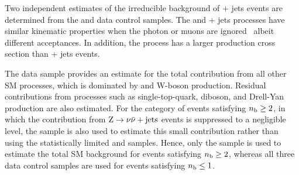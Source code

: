 Two independent estimates of the irreducible background of \znunu +
jets events are determined from the \gj and \mmj data control samples.
The \gj and \zmumu + jets processes have similar kinematic properties
when the photon or muons are ignored~\cite{Bern:2011pa} albeit
different acceptances. In addition, the \gj process has a larger
production cross section than \znunu + jets events.

The \mj data sample provides an estimate for the total
contribution from all other SM processes, which is dominated by \ttbar
and W-boson production. Residual contributions from processes such as
single-top-quark, diboson, and Drell-Yan production are also
estimated. For the category of events satisfying $\nb \geq 2$, in
which the contribution from $\znunu + \text{jets}$ events is
suppressed to a negligible level, the \mj sample is also used to
estimate this small contribution rather than using the statistically
limited \mmj and \gj samples. Hence, only the \mj sample is used to
estimate the total SM background for events satisfying $\nb \geq 2$,
whereas all three data control samples are used for events satisfying
$\nb \leq 1$.


